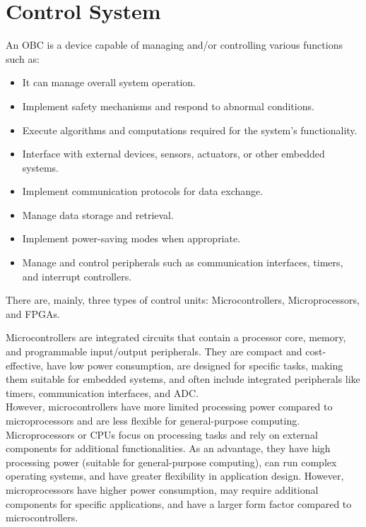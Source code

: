\section{Control System}
An \gls{OBC} is a device capable of managing and/or controlling various functions such as:
\begin{itemize}
    \item It can manage overall system operation.
    \item Implement safety mechanisms and respond to abnormal conditions.
    \item Execute algorithms and computations required for the system's functionality.
    \item Interface with external devices, sensors, actuators, or other embedded systems.
    \item Implement communication protocols for data exchange.
    \item Manage data storage and retrieval.
    \item Implement power-saving modes when appropriate.
    \item Manage and control peripherals such as communication interfaces, timers, and interrupt controllers.
\end{itemize}

There are, mainly, three types of control units: Microcontrollers, Microprocessors, and \glspl{FPGA}.

Microcontrollers are integrated circuits that contain a processor core, memory, and programmable input/output peripherals.
They are compact and cost-effective, have low power consumption, are designed for specific tasks, making them suitable for embedded systems, and often include integrated peripherals like timers, communication interfaces, and ADC.\\
However, microcontrollers have more limited processing power compared to microprocessors and are less flexible for general-purpose computing.\\

Microprocessors or \glspl{CPU} focus on processing tasks and rely on external components for additional functionalities.
As an advantage, they have high processing power (suitable for general-purpose computing), can run complex operating systems, and have greater flexibility in application design.
However, microprocessors have higher power consumption, may require additional components for specific applications, and have a larger form factor compared to microcontrollers.\\

